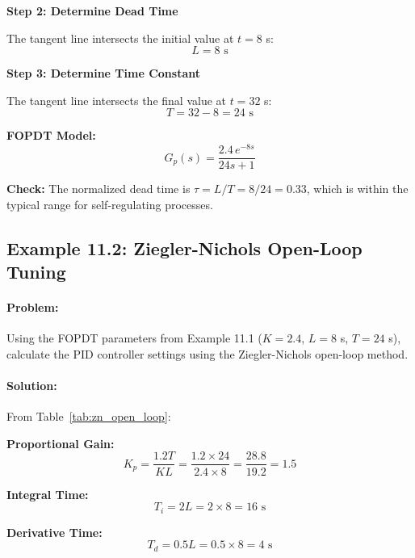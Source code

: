 \textbf{Step 2: Determine Dead Time}

The tangent line intersects the initial value at $t = 8$ s:
\begin{equation}
    L = 8 \text{ s}
\end{equation}

\textbf{Step 3: Determine Time Constant}

The tangent line intersects the final value at $t = 32$ s:
\begin{equation}
    T = 32 - 8 = 24 \text{ s}
\end{equation}

\textbf{FOPDT Model:}
\begin{equation}
    G_p(s) = \frac{2.4 \, e^{-8s}}{24s + 1}
\end{equation}

\textbf{Check:} The normalized dead time is $\tau = L/T = 8/24 = 0.33$, which is within the typical range for self-regulating processes.

\hrulefill

\subsection{Example 11.2: Ziegler-Nichols Open-Loop Tuning}

\paragraph{Problem:} Using the FOPDT parameters from Example 11.1 ($K = 2.4$, $L = 8$ s, $T = 24$ s), calculate the PID controller settings using the Ziegler-Nichols open-loop method.

\paragraph{Solution:}

From Table~\ref{tab:zn_open_loop}:

\textbf{Proportional Gain:}
\begin{equation}
    K_p = \frac{1.2 T}{K L} = \frac{1.2 \times 24}{2.4 \times 8} = \frac{28.8}{19.2} = 1.5
\end{equation}

\textbf{Integral Time:}
\begin{equation}
    T_i = 2L = 2 \times 8 = 16 \text{ s}
\end{equation}

\textbf{Derivative Time:}
\begin{equation}
    T_d = 0.5L = 0.5 \times 8 = 4 \text{ s}
\end{equation}

